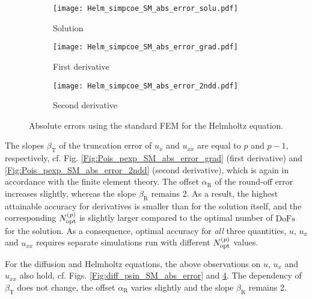 \documentclass[final,3p]{elsarticle}
\begin{document}
\begin{figure}[!ht]
    \begin{subfigure}{5.5cm}
        \texttt{[image: Helm\_simpcoe\_SM\_abs\_error\_solu.pdf]}
        \caption{Solution}
        \label{Fig:Helm_simpcoe_SM_abs_error_solu}
    \end{subfigure}
    \begin{subfigure}{5.5cm}
        \texttt{[image: Helm\_simpcoe\_SM\_abs\_error\_grad.pdf]}
        \caption{First derivative}
        \label{Fig:Helm_simpcoe_SM_abs_error_grad}
    \end{subfigure}
    \begin{subfigure}{5.5cm}
        \texttt{[image: Helm\_simpcoe\_SM\_abs\_error\_2ndd.pdf]}
        \caption{Second derivative}
        \label{Fig:Helm_simpcoe_SM_abs_error_2ndd}
    \end{subfigure}
\caption{Absolute errors using the standard FEM for the Helmholtz equation.}
\label{Fig:Helm_simpcoe_SM_abs_error}
\end{figure}

The slopes $\beta _{\text{T}}$ of the truncation error of $u_x$ and $u_{xx}$ are equal to $p$ and $p-1$, respectively, cf. Fig. \ref{Fig:Pois_pexp_SM_abs_error_grad} (first derivative) and \ref{Fig:Pois_pexp_SM_abs_error_2ndd} (second derivative), which is again in accordance with the finite element theory. The offset $\alpha_{\text{R}}$ of the round-off error increases slightly, whereas the slope $\beta_{\text{R}}$ remains 2. As a result, the highest attainable accuracy for derivatives is smaller than for the solution itself, and the corresponding $N_{\rm opt}^{(p)}$ is slightly larger compared to the optimal number of $\text{DoFs}$ for the solution. As a consequence, optimal accuracy for \emph{all} three quantities, $u$, $u_x$ and $u_{xx}$ requires separate simulations run with different $N_{\rm opt}^{(p)}$ values.

For the diffusion and Helmholtz equations, the above observations on $u$, $u_x$ and $u_{xx}$ also hold, cf. Figs. \ref{Fig:diff_psin_SM_abs_error} and \ref{Fig:Helm_simpcoe_SM_abs_error}.
The dependency of $\beta _{\text{T}}$ does not change, the offset $\alpha_{\text{R}}$ varies slightly and the slope $\beta_{\text{R}}$ remains 2.
\end{document}
